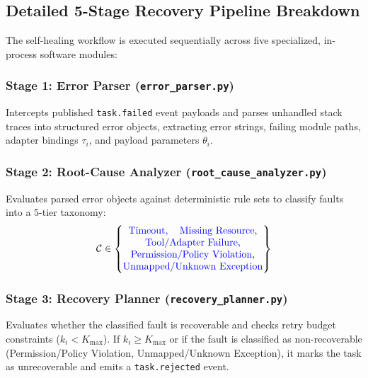 \documentclass[conference]{IEEEtran}
\newcommand{\chg}[1]{{\color{blue}#1}}
\begin{document}
\subsection{Detailed 5-Stage Recovery Pipeline Breakdown}
The self-healing workflow is executed sequentially across five specialized, in-process software modules:

\subsubsection{Stage 1: Error Parser (\texttt{error\_parser.py})}
Intercepts published \texttt{task.failed} event payloads and parses unhandled stack traces into structured error objects, extracting error strings, failing module paths, adapter bindings $\tau_i$, and payload parameters $\theta_i$.

\subsubsection{Stage 2: Root-Cause Analyzer (\texttt{root\_cause\_analyzer.py})}
Evaluates parsed error objects against deterministic rule sets to classify faults into a 5-tier taxonomy:
\begin{equation}
\mathcal{C} \in
\begin{Bmatrix}
\chg{\text{Timeout}, \quad \text{Missing Resource}}, \\
\chg{\text{Tool/Adapter Failure}}, \\
\chg{\text{Permission/Policy Violation}}, \\
\chg{\text{Unmapped/Unknown Exception}}
\end{Bmatrix}
\end{equation}

\subsubsection{Stage 3: Recovery Planner (\texttt{recovery\_planner.py})}
Evaluates whether the classified fault is recoverable and checks retry budget constraints ($k_i < K_{\text{max}}$). If $k_i \ge K_{\text{max}}$ or if the fault is classified as \chg{non-recoverable (Permission/Policy Violation, Unmapped/Unknown Exception)}, it marks the task as unrecoverable and emits a \texttt{task.rejected} event.
\end{document}
